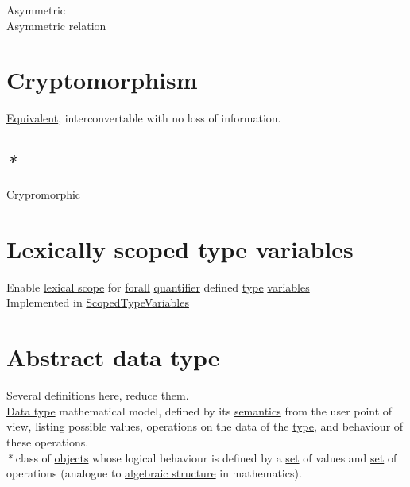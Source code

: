 \documentclass[a4paper,14pt,oneside]{book}
\begin{document}
{\label{org227b668}Asymmetric\\
\label{org0dd49b1}Asymmetric relation\\

\chapter{\label{orgdd910a3}Cryptomorphism}
\label{sec:orgce2facc}

\hyperref[orgfc48fc8]{Equivalent}, interconvertable with no loss of information.\\

\section{\emph{*}}
\label{sec:orgc88d10e}

\label{org5bf0dd0}Crypromorphic\\

\chapter{\label{org891fc64}Lexically scoped type variables}
\label{sec:orgdfd78d8}

Enable \hyperref[orga0e6f8f]{lexical scope} for \hyperref[org99c9fb1]{forall} \hyperref[org965fc88]{quantifier} defined \hyperref[orga9ca243]{type} \hyperref[org3e16d0c]{variables}\\

Implemented in \hyperref[org9ff180d]{ScopedTypeVariables}\\

\chapter{\label{orgfb7c86e}Abstract data type}
\label{sec:org4410a9c}

Several definitions here, reduce them.\\

\hyperref[org3de168a]{Data type} mathematical model, defined by its \hyperref[orgcecfd32]{semantics} from the user point of view, listing possible values, operations on the data of the \hyperref[orga9ca243]{type}, and behaviour of these operations.\\

\emph{*} class of \hyperref[org7c09bf4]{objects} whose logical behaviour is defined by a \hyperref[org0726f94]{set} of values and \hyperref[org0726f94]{set} of operations (analogue to \hyperref[org57a3d22]{algebraic structure} in mathematics).\\

}
\end{document}
